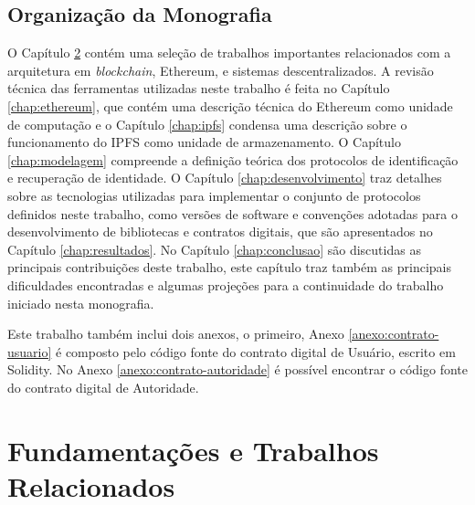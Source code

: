 \documentclass[tcc,capa]{texufpel}
\begin{document}
\section{Organização da Monografia}\label{sc:organizao-da-monografia}

    O Capítulo \ref{chap:trabalhos-relacionados} contém uma seleção de trabalhos importantes relacionados com a arquitetura em \textit{blockchain}, Ethereum,  e sistemas descentralizados. A revisão técnica das ferramentas utilizadas neste trabalho é feita no Capítulo \ref{chap:ethereum}, que contém uma descrição técnica do Ethereum como unidade de computação e o Capítulo \ref{chap:ipfs} condensa uma descrição sobre o funcionamento do IPFS como unidade de armazenamento. O Capítulo \ref{chap:modelagem} compreende a definição teórica dos protocolos de identificação e recuperação de identidade. O Capítulo \ref{chap:desenvolvimento} traz detalhes sobre as tecnologias utilizadas para implementar o conjunto de protocolos definidos neste trabalho, como versões de software e convenções adotadas para o desenvolvimento de bibliotecas e contratos digitais, que são apresentados no Capítulo \ref{chap:resultados}. No Capítulo \ref{chap:conclusao} são discutidas as principais contribuições deste trabalho, este capítulo traz também as principais dificuldades encontradas e algumas projeções para a continuidade do trabalho iniciado nesta monografia.
    
    Este trabalho também inclui dois anexos, o primeiro, Anexo \ref{anexo:contrato-usuario} é composto pelo código fonte do contrato digital de Usuário, escrito em Solidity. No Anexo \ref{anexo:contrato-autoridade} é possível encontrar o código fonte do contrato digital de Autoridade.
    



\chapter{Fundamentações e Trabalhos Relacionados}\label{chap:trabalhos-relacionados}
    
\end{document}
